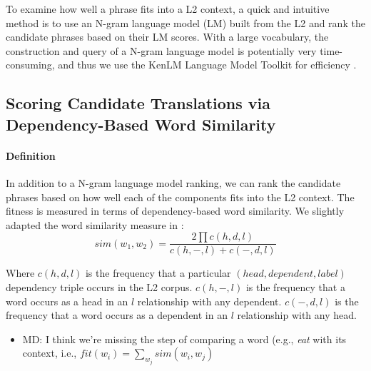 \documentclass[11pt]{article}
\begin{document}
To examine how well a phrase fits into a L2 context, a quick and intuitive method is to use an N-gram language model (LM) built from the L2 and rank the candidate phrases based on their LM scores. With a large vocabulary, the construction and query of a N-gram language model is potentially very time-consuming, and thus we use the KenLM Language Model Toolkit for efficiency \cite{heafield:kenlm:11}.


\subsection{Scoring Candidate Translations via Dependency-Based Word Similarity}
\label{sec:dependencySIM}

\paragraph{Definition} In addition to a N-gram language model ranking, we can rank the candidate phrases based on how well each of the components fits into the L2 context. The fitness is measured in terms of dependency-based word similarity. We slightly adapted the word similarity measure in \cite{lin:98}:
\begin{equation}
sim(w_1,w_2) = \frac{2 \prod c(h,d,l)} 
{c(h,-,l) + c(-,d,l)}
\end{equation}

Where $c(h,d,l)$ is the frequency that a particular $(head, dependent, label)$ dependency triple occurs in the L2 corpus. $c(h,-,l)$ is the frequency that a word occurs as a head in an $l$ relationship with any dependent. $c(-,d,l)$ is the frequency that a word occurs as a dependent in an $l$ relationship with any head. 

\begin{itemize}
\item MD: I think we're missing the step of comparing a word (e.g.,
  \textit{eat} with its context, i.e., $fit(w_i) = \sum_{w_j}
  sim(w_i,w_j)$
\end{itemize}
\end{document}
